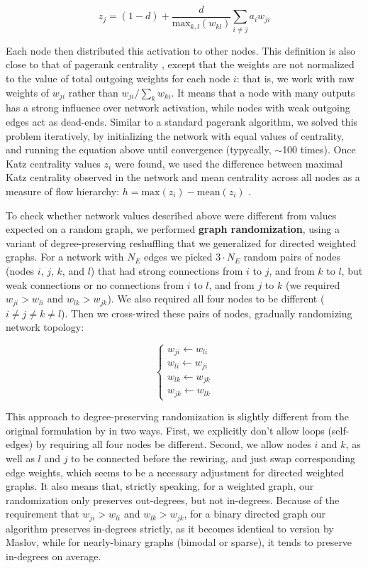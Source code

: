 \documentclass{article}
\begin{document}
\[ z_j = (1-d) + \frac{d}{\text{max}_{k,l}(w_{kl})} \sum_{i \neq j}{a_i w_{ji}} \]

Each node then distributed this activation to other nodes. This definition is also close to that of pagerank centrality \citep{page1999pagerank}, except that the weights are not normalized to the value of total outgoing weights for each node $i$: that is, we work with raw weights of $w_{ji}$ rather than $w_{ji}/\sum_k{w_{ki}}$. It means that a node with many outputs has a strong influence over network activation, while nodes with weak outgoing edges act as dead-ends. Similar to a standard pagerank algorithm, we solved this problem iteratively, by initializing the network with equal values of centrality, and running the equation above until convergence (typycally, $\sim$100 times). Once Katz centrality values $z_i$ were found, we used the difference between maximal Katz centrality observed in the network and mean centrality across all nodes as a measure of flow hierarchy: $h = \text{max}(z_i) - \text{mean}(z_i)$ \citep{mones2012hierarchy,czegel2015hierarchy}.

To check whether network values described above were different from values expected on a random graph, we performed \textbf{graph randomization}, using a variant of degree-preserving reshuffling \citep{maslov2002} that we generalized for directed weighted graphs. For a network with $N_E$ edges we picked $3\cdot N_E$ random pairs of nodes (nodes $i$, $j$, $k$, and $l$) that had strong connections from $i$ to $j$, and from $k$ to $l$, but weak connections or no connections from $i$ to $l$, and from $j$ to $k$ (we required $w_{ji}>w_{li}$ and $w_{lk}>w_{jk}$). We also required all four nodes to be different ($i \neq j \neq k \neq l$). Then we cross-wired these pairs of nodes, gradually randomizing network topology:

\[ \left \{ \begin{array}{l}  
w_{ji} \leftarrow w_{li} \\ 
w_{li} \leftarrow w_{ji} \\
w_{lk} \leftarrow w_{jk} \\
w_{jk} \leftarrow w_{lk}
\end{array} \right. \]

This approach to degree-preserving randomization is slightly different from the original formulation by \citep{maslov2002} in two ways. First, we explicitly don’t allow loops (self-edges) by requiring all four nodes be different. Second, we allow nodes $i$ and $k$, as well as $l$ and $j$ to be connected before the rewiring, and just swap corresponding edge weights, which seems to be a necessary adjustment for directed weighted graphs. It also means that, strictly speaking, for a weighted graph, our randomization only preserves out-degrees, but not in-degrees. Because of the requirement that $w_{ji}>w_{li}$ and $w_{lk}>w_{jk}$, for a binary directed graph our algorithm preserves in-degrees strictly, as it becomes identical to version by Maslov, while for nearly-binary graphs (bimodal or sparse), it tends to preserve in-degrees on average.
\end{document}
